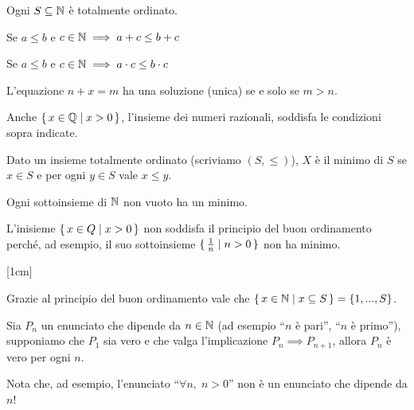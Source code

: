 \begin{remark}
Ogni $S \subseteq \mathbb N$ è totalmente ordinato.
\end{remark}

Se $a \le b$ e $c \in \mathbb N \implies a+c \le b+c$

Se $a \le b$ e $c \in \mathbb N \implies a \cdot c \le b \cdot c$ 

L'equazione $n+x=m$ ha una soluzione (unica) se e solo se $m > n$.

Anche $\set{x \in \mathbb Q| x > 0}$, l'insieme dei numeri razionali, soddisfa le condizioni sopra indicate.

\begin{definition}
Dato un insieme totalmente ordinato (scriviamo $(S, \le)$), $X$ è il minimo di $S$ se $x \in S$ e per ogni $y \in S$ vale $x \le y$.
\end{definition}

\begin{proposition}
Ogni sottoinsieme di $\mathbb N$ non vuoto ha un minimo.
\end{proposition}

\begin{example}
L'inisieme $\set{x \in Q | x > 0}$ non soddisfa il principio del buon ordinamento perché, ad esempio, il suo sottoinsieme $\set{\frac{1}{n} | n > 0}$ non ha minimo.
\end{example}

[1cm]

\begin{remark}
Grazie al principio del buon ordinamento vale che $\set{x \in \mathbb N| x \subseteq S} = \{1, ..., S\}$.
\end{remark}

\begin{proposition}
Sia $P_n$ un enunciato che dipende da $n \in \mathbb N$ (ad esempio ``$n$ è pari'', ``$n$ è primo''), supponiamo che $P_1$ sia vero e che valga l'implicazione $P_n \implies P_{n+1}$, allora $P_n$ è vero per ogni $n$.
\end{proposition}

Nota che, ad esempio, l'enunciato ``$\forall n,\;n > 0$'' non è un enunciato che dipende da $n$!


